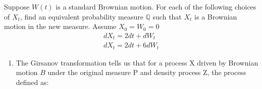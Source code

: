 \documentclass[12pt,a4paper]{exam}
\begin{document}
\begin{questions}
\question Suppose $W(t)$ is a standard Brownian motion. For each of the following choices of $X_t$, find an equivalent probability measure $\mathbb{Q}$ such that $X_t$ is a Brownian motion in the new measure. Assume $X_0=W_0=0$
\begin{equation*}
\begin{gathered}
dX_t = 2dt + dW_t\\
dX_t = 2dt + 6dW_t
\end{gathered}
\end{equation*}

\fillwithlines{3cm}
\begin{solution}
\begin{enumerate}[label=(\alph*),font=\itshape]
\item The Girsanov transformation tells us that for a process X driven by Brownian motion $B$ under the original measure P and density process Z, the process defined as:

%
%
%
%
%
%
%
%
%
%
%
%
%
\end{enumerate}
\end{solution}


\end{questions}
\end{document}
